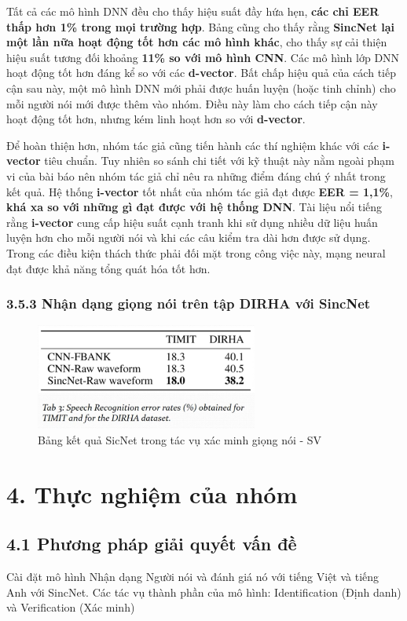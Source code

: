 \documentclass{article}
\begin{document}
	Tất cả các mô hình DNN đều cho thấy hiệu suất đầy hứa hẹn, \textbf{các chỉ EER thấp hơn 1\% trong mọi trường hợp}. Bảng cũng cho thấy rằng \textbf{SincNet lại một lần nữa hoạt động tốt hơn các mô hình khác}, cho thấy sự cải thiện hiệu suất tương đối khoảng \textbf{11\% so với mô hình CNN}. Các mô hình lớp DNN hoạt động tốt hơn đáng kể so với các \textbf{d-vector}. Bất chấp hiệu quả của cách tiếp cận sau này, một mô hình DNN mới phải được huấn luyện (hoặc tinh chỉnh) cho mỗi người nói mới được thêm vào nhóm. Điều này làm cho cách tiếp cận này hoạt động tốt hơn, nhưng kém linh hoạt hơn so với \textbf{d-vector}.
	
	Để hoàn thiện hơn, nhóm tác giả cũng tiến hành các thí nghiệm khác với các \textbf{i-vector} tiêu chuẩn. Tuy nhiên so sánh chi tiết với kỹ thuật này nằm ngoài phạm vi của bài báo nên nhóm tác giả chỉ nêu ra những điểm đáng chú ý nhất trong kết quả. Hệ thống \textbf{i-vector} tốt nhất của nhóm tác giả đạt được \textbf{EER = 1,1\%}, \textbf{khá xa so với những gì đạt được với hệ thống DNN}. Tài liệu nổi tiếng rằng \textbf{i-vector} cung cấp hiệu suất cạnh tranh khi sử dụng nhiều dữ liệu huấn luyện hơn cho mỗi người nói và khi các câu kiểm tra dài hơn được sử dụng. Trong các điều kiện thách thức phải đối mặt trong công việc này, mạng neural đạt được khả năng tổng quát hóa tốt hơn.

	\subsubsection{3.5.3 Nhận dạng giọng nói trên tập DIRHA với SincNet}
	\begin{figure}[H]
		\centering
		\includegraphics[width=0.65\textwidth]{images/sr_sincnet_result.png}
		\caption{Bảng kết quả SicNet trong tác vụ xác minh giọng nói - SV}
		\label{fig:writing-thesis}
	\end{figure}
	\section{4. Thực nghiệm của nhóm}
	\subsection{4.1 Phương pháp giải quyết vấn đề}
	Cài đặt mô hình Nhận dạng Người nói và đánh giá nó với tiếng Việt và tiếng Anh với SincNet.
	Các tác vụ thành phần của mô hình: Identification (Định danh) và Verification (Xác minh)
	
\end{document}
